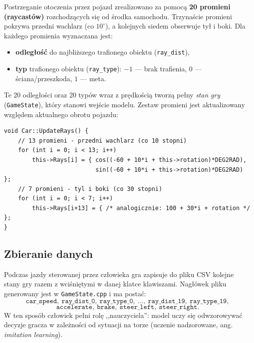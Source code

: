 \documentclass[11pt,a4paper]{article}
\begin{document}
Postrzeganie otoczenia przez pojazd zrealizowano za pomocą \textbf{20 promieni
(raycastów)} rozchodzących się od środka samochodu. Trzynaście promieni pokrywa
przedni wachlarz (co $10^\circ$), a kolejnych siedem obserwuje tył i boki. Dla
każdego promienia wyznaczana jest:
\begin{itemize}[noitemsep]
  \item \textbf{odległość} do najbliższego trafionego obiektu (\texttt{ray\_dist}),
  \item \textbf{typ} trafionego obiektu (\texttt{ray\_type}): $-1$ --- brak trafienia,
        $0$ --- ściana/przeszkoda, $1$ --- meta.
\end{itemize}

Te 20 odległości oraz 20 typów wraz z prędkością tworzą pełny \emph{stan gry}
(\texttt{GameState}), który stanowi wejście modelu. Zestaw promieni jest aktualizowany
względem aktualnego obrotu pojazdu:

\noindent\begin{minipage}{\linewidth}
\begin{lstlisting}[style=cpp,caption={Wyznaczanie kierunków promieni (fragment \texttt{Car.cpp}).}]
void Car::UpdateRays() {
    // 13 promieni - przedni wachlarz (co 10 stopni)
    for (int i = 0; i < 13; i++)
        this->Rays[i] = { cos((-60 + 10*i + this->rotation)*DEG2RAD),
                          sin((-60 + 10*i + this->rotation)*DEG2RAD) };
    // 7 promieni - tyl i boki (co 30 stopni)
    for (int i = 0; i < 7; i++)
        this->Rays[i+13] = { /* analogicznie: 100 + 30*i + rotation */ };
}
\end{lstlisting}
\end{minipage}

\subsection{Zbieranie danych}

Podczas jazdy sterowanej przez człowieka gra zapisuje do pliku CSV kolejne stany
gry razem z wciśniętymi w danej klatce klawiszami. Nagłówek pliku generowany jest
w \texttt{GameState.cpp} i ma postać:
\[
\texttt{car\_speed},\ \texttt{ray\_dist\_0},\ \texttt{ray\_type\_0},\ \dots,\
\texttt{ray\_dist\_19},\ \texttt{ray\_type\_19},
\]
\[
\texttt{accelerate},\ \texttt{brake},\ \texttt{steer\_left},\ \texttt{steer\_right}.
\]
W ten sposób człowiek pełni rolę ,,nauczyciela'': model uczy się odwzorowywać
decyzje gracza w zależności od sytuacji na torze (uczenie nadzorowane, ang.
\emph{imitation learning}).
\end{document}
